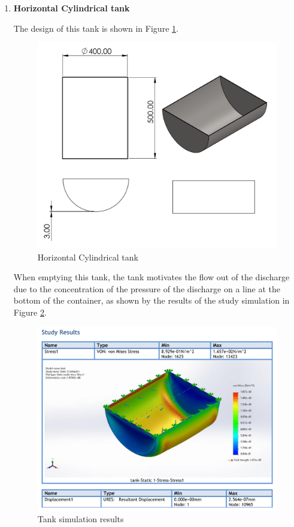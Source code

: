 \begin{itemize}
\begin{enumerate}
    \item \textbf{Horizontal Cylindrical tank}
    \par
    The design of this tank is shown in Figure \ref{fig:horizontal_cylindrical_tank}.
    \begin{figure}[H]
        \centering
        \includegraphics[height=.25\textheight]{Figures/tank2.PNG}
        \caption{Horizontal Cylindrical tank}
        \label{fig:horizontal_cylindrical_tank}
    \end{figure}
    When emptying this tank, the tank motivates the flow out of the discharge due to the concentration of the pressure of the discharge on a line at the bottom of the container, as shown by the results of the study simulation in Figure \ref{fig:tank_simulation_results}.
    \begin{figure}[H]
        \centering
        \includegraphics[width=\textwidth, height=.4\textheight]{Figures/tank-Static-1-1-1.png}
        \caption{Tank simulation results}
        \label{fig:tank_simulation_results}
    \end{figure}
\end{enumerate}


\end{itemize}
